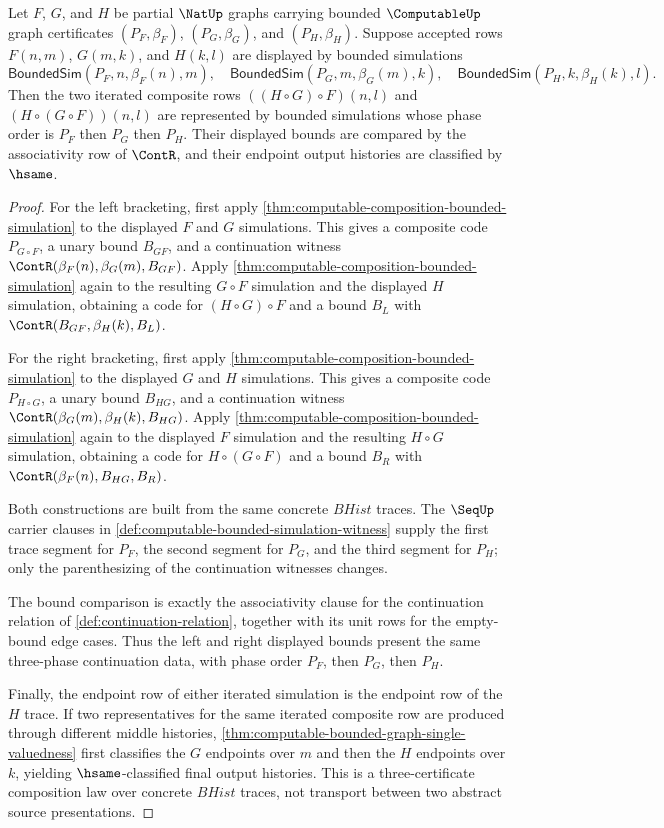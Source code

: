 \begin{theorem}
\label{thm:computable-bounded-graph-composition-associativity}
Let $F$, $G$, and $H$ be partial $\NatUp$ graphs carrying bounded $\ComputableUp$ graph certificates $(P_F,\beta_F)$, $(P_G,\beta_G)$, and $(P_H,\beta_H)$. Suppose accepted rows $F(n,m)$, $G(m,k)$, and $H(k,l)$ are displayed by bounded simulations
$$
  \mathsf{BoundedSim}(P_F,n,\beta_F(n),m),
  \quad
  \mathsf{BoundedSim}(P_G,m,\beta_G(m),k),
  \quad
  \mathsf{BoundedSim}(P_H,k,\beta_H(k),l).
$$
Then the two iterated composite rows $((H\circ G)\circ F)(n,l)$ and $(H\circ(G\circ F))(n,l)$ are represented by bounded simulations whose phase order is $P_F$ then $P_G$ then $P_H$. Their displayed bounds are compared by the associativity row of $\ContR$, and their endpoint output histories are classified by $\hsame$.
\end{theorem}
\begin{proof}
For the left bracketing, first apply \autoref{thm:computable-composition-bounded-simulation} to the displayed $F$ and $G$ simulations. This gives a composite code $P_{G\circ F}$, a unary bound $B_{GF}$, and a continuation witness $\ContR(\beta_F(n),\beta_G(m),B_{GF})$. Apply \autoref{thm:computable-composition-bounded-simulation} again to the resulting $G\circ F$ simulation and the displayed $H$ simulation, obtaining a code for $(H\circ G)\circ F$ and a bound $B_L$ with $\ContR(B_{GF},\beta_H(k),B_L)$.

For the right bracketing, first apply \autoref{thm:computable-composition-bounded-simulation} to the displayed $G$ and $H$ simulations. This gives a composite code $P_{H\circ G}$, a unary bound $B_{HG}$, and a continuation witness $\ContR(\beta_G(m),\beta_H(k),B_{HG})$. Apply \autoref{thm:computable-composition-bounded-simulation} again to the displayed $F$ simulation and the resulting $H\circ G$ simulation, obtaining a code for $H\circ(G\circ F)$ and a bound $B_R$ with $\ContR(\beta_F(n),B_{HG},B_R)$.

Both constructions are built from the same concrete $BHist$ traces. The $\SeqUp$ carrier clauses in \autoref{def:computable-bounded-simulation-witness} supply the first trace segment for $P_F$, the second segment for $P_G$, and the third segment for $P_H$; only the parenthesizing of the continuation witnesses changes.

The bound comparison is exactly the associativity clause for the continuation relation of \autoref{def:continuation-relation}, together with its unit rows for the empty-bound edge cases. Thus the left and right displayed bounds present the same three-phase continuation data, with phase order $P_F$, then $P_G$, then $P_H$.

Finally, the endpoint row of either iterated simulation is the endpoint row of the $H$ trace. If two representatives for the same iterated composite row are produced through different middle histories, \autoref{thm:computable-bounded-graph-single-valuedness} first classifies the $G$ endpoints over $m$ and then the $H$ endpoints over $k$, yielding $\hsame$-classified final output histories. This is a three-certificate composition law over concrete $BHist$ traces, not transport between two abstract source presentations.
\end{proof}
